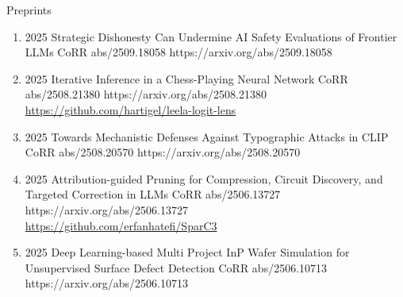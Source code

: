 \headedsubsection %
{Preprints}{}
{
    \begin{enumerate}
    
        \item {}
                        {2025}
                        {Strategic Dishonesty Can Undermine AI Safety Evaluations of Frontier LLMs}
                        {CoRR abs/2509.18058}
                        {https://arxiv.org/abs/2509.18058}                       
                        
    
        \item {}
                        {2025}
                        {Iterative Inference in a Chess-Playing Neural Network}
                        {CoRR abs/2508.21380}
                        {https://arxiv.org/abs/2508.21380}
                        {
                            \\
                            \href{https://github.com/hartigel/leela-logit-lens}{https://github.com/hartigel/leela-logit-lens}
                        }

            
        \item {}
                        {2025}
                        {Towards Mechanistic Defenses Against Typographic Attacks in CLIP}
                        {CoRR abs/2508.20570}
                        {https://arxiv.org/abs/2508.20570}   
                        
    
        \item {}
                        {2025}
                        {Attribution-guided Pruning for Compression, Circuit Discovery, and Targeted Correction in LLMs}
                        {CoRR abs/2506.13727}
                        {https://arxiv.org/abs/2506.13727}
                        {
                            \\ \href{https://github.com/erfanhatefi/SparC3}{https://github.com/erfanhatefi/SparC3}
                        }
    
    
        \item {}
                        {2025}
                        {Deep Learning-based Multi Project InP Wafer Simulation for Unsupervised Surface Defect Detection}
                        {CoRR abs/2506.10713}
                        {https://arxiv.org/abs/2506.10713}
    

\end{enumerate}}
